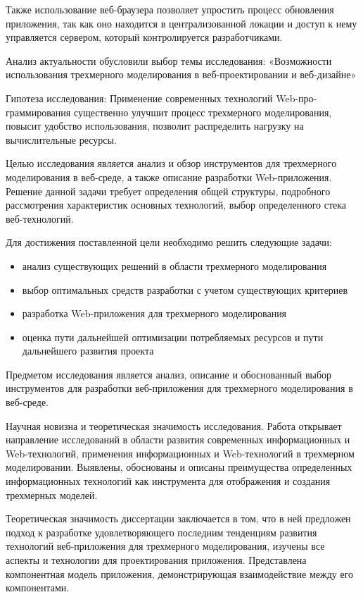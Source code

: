 Также использование веб-браузера позволяет упростить процесс обновления приложения, так как оно 
находится в централизованной локации и доступ к нему управляется сервером, который контролируется разработчиками.

Анализ актуальности обусловили выбор темы исследования: «Возможности использования трехмерного моделирования в веб-проектировании и веб-дизайне»

Гипотеза исследования: Применение современных технологий Web-про-граммирования существенно улучшит процесс трехмерного моделирования, повысит удобство использования, позволит распределить 
нагрузку на вычислительные ресурсы.

Целью исследования является анализ и обзор инструментов для трехмерного моделирования в веб-среде, а также описание разработки Web-приложения. Решение данной задачи требует определения общей
структуры, подробного рассмотрения характеристик основных технологий, выбор определенного стека веб-технологий.

Для достижения поставленной цели необходимо решить следующие задачи:  
\begin{itemize}
\item анализ существующих решений в области трехмерного моделирования
\item выбор оптимальных средств разработки с учетом существующих критериев  
\item разработка Web-приложения для трехмерного моделирования  
\item оценка пути дальнейшей оптимизации потребляемых ресурсов и пути дальнейшего развития проекта
\end{itemize}

Предметом исследования является анализ, описание и обоснованный выбор инструментов для разработки веб-приложения для трехмерного моделирования в веб-среде.

Научная новизна и теоретическая значимость исследования. Работа открывает направление исследований в области развития современных информационных и Web-технологий, применения информационных 
и Web-технологий в трехмерном моделировании. Выявлены, обоснованы и описаны преимущества определенных информационных технологий как инструмента 
для отображения и создания трехмерных моделей. 

Теоретическая значимость диссертации заключается в том, что в ней предложен подход к разработке удовлетворяющего последним тенденциям развития технологий веб-приложения для трехмерного моделирования, 
изучены все аспекты и технологии для проектирования приложения. Представлена компонентная модель приложения, 
демонстрирующая взаимодействие между его компонентами.

